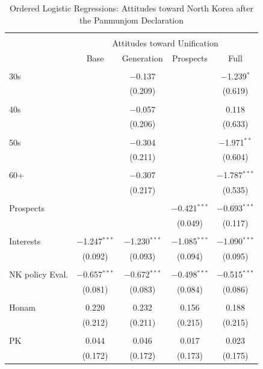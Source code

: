 \documentclass[letterpaper,9pt,twocolumn,twoside,]{pinp}
\begin{document}
\begin{table}[!htbp] \centering 
  \caption{Ordered Logistic Regressions: Attitudes toward North Korea after the Panmunjom Declaration} 
  \label{tab2} 
\begin{tabular}{@{\extracolsep{5pt}}lcccc} 
\\[-1.8ex]\hline 
\hline \\[-1.8ex] 
 & \multicolumn{4}{c}{Attitudes toward Unification} \\ 
\cline{2-5} 
 & Base & Generation & Prospects & Full \\ 
\hline \\[-1.8ex] 
 30s &  & $-$0.137 &  & $-$1.239$^{*}$ \\ 
  &  & (0.209) &  & (0.619) \\ 
  & & & & \\ 
 40s &  & $-$0.057 &  & 0.118 \\ 
  &  & (0.206) &  & (0.633) \\ 
  & & & & \\ 
 50s &  & $-$0.304 &  & $-$1.971$^{**}$ \\ 
  &  & (0.211) &  & (0.604) \\ 
  & & & & \\ 
 60+ &  & $-$0.307 &  & $-$1.787$^{***}$ \\ 
  &  & (0.217) &  & (0.535) \\ 
  & & & & \\ 
 Prospects &  &  & $-$0.421$^{***}$ & $-$0.693$^{***}$ \\ 
  &  &  & (0.049) & (0.117) \\ 
  & & & & \\ 
 Interests & $-$1.247$^{***}$ & $-$1.230$^{***}$ & $-$1.085$^{***}$ & $-$1.090$^{***}$ \\ 
  & (0.092) & (0.093) & (0.094) & (0.095) \\ 
  & & & & \\ 
 NK policy Eval. & $-$0.657$^{***}$ & $-$0.672$^{***}$ & $-$0.498$^{***}$ & $-$0.515$^{***}$ \\ 
  & (0.081) & (0.083) & (0.084) & (0.086) \\ 
  & & & & \\ 
 Honam & 0.220 & 0.232 & 0.156 & 0.188 \\ 
  & (0.212) & (0.211) & (0.215) & (0.215) \\ 
  & & & & \\ 
 PK & 0.044 & 0.046 & 0.017 & 0.023 \\ 
  & (0.172) & (0.172) & (0.173) & (0.175) \\ 

\end{tabular}
\end{table}
\end{document}

